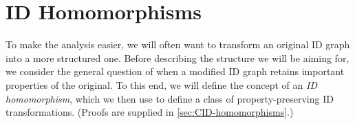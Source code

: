 \section{ID Homomorphisms} \label{sec:CID-homomorphisms-main}


To make the analysis easier, we will often want to transform an original ID graph into a more structured one.
Before describing the structure we will be aiming for, we consider the general question of when a modified ID graph retains important properties of the original.
To this end, we will define  the concept of an \emph{ID homomorphism}, 
which we then use to define a class of property-preserving ID transformations. (Proofs are supplied in \cref{sec:CID-homomorphisms}.)%








